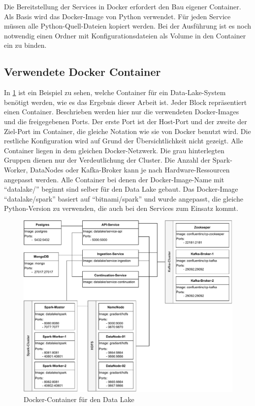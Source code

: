 Die Bereitstellung der Services in Docker erfordert den Bau eigener Container.
Als Basis wird das Docker-Image von Python verwendet.
Für jeden Service müssen alle Python-Quell-Dateien kopiert werden.
Bei der Ausführung ist es noch notwendig einen Ordner mit Konfigurationsdateien als Volume in den Container ein zu binden.

\subsection{Verwendete Docker Container}

In \cref{fig:docker-datalake} ist ein Beispiel zu sehen, welche Container für ein Data-Lake-System benötigt werden, wie es das Ergebnis dieser Arbeit ist.
Jeder Block repräsentiert einen Container.
Beschrieben werden hier nur die verwendeten Docker-Images und die freigegebenen Ports.
Der erste Port ist der Host-Port und der zweite der Ziel-Port im Container, die gleiche Notation wie sie von Docker benutzt wird.
Die restliche Konfiguration wird auf Grund der Übersichtlichkeit nicht gezeigt.
Alle Container liegen in dem gleichen Docker-Netzwerk.
Die grau hinterlegten Gruppen dienen nur der Verdeutlichung der Cluster.
Die Anzahl der Spark-Worker, DataNodes oder Kafka-Broker kann je nach Hardware-Ressourcen angepasst werden.
Alle Container bei denen der Docker-Image-Name mit "`datalake/"' beginnt sind selber für den Data Lake gebaut.
Das Docker-Image "`datalake/spark"' basiert auf "`bitnami/spark"' und wurde angepasst, die gleiche Python-Version zu verwenden, die auch bei den Services zum Einsatz kommt.

\begin{figure}
    \centering
    \includegraphics[width=\textwidth]{Grafiken/Umsetzung-Docker-Lake.pdf}
    \caption{Docker-Container für den Data Lake}
    \label{fig:docker-datalake}
\end{figure}
